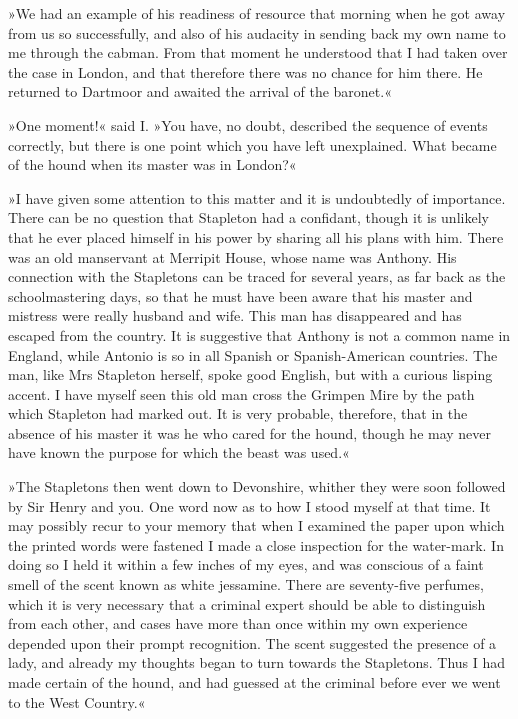 »We had an example of his readiness of resource that morning when he got away from us so successfully, and also of his audacity in sending back my own name to me through the cabman. From that moment he understood that I had taken over the case in London, and that therefore there was no chance for him there. He returned to Dartmoor and awaited the arrival of the baronet.«

»One moment!« said I. »You have, no doubt, described the sequence of events correctly, but there is one point which you have left unexplained. What became of the hound when its master was in London?«

»I have given some attention to this matter and it is undoubtedly of importance. There can be no question that Stapleton had a confidant, though it is unlikely that he ever placed himself in his power by sharing all his plans with him. There was an old manservant at Merripit House, whose name was Anthony. His connection with the Stapletons can be traced for several years, as far back as the schoolmastering days, so that he must have been aware that his master and mistress were really husband and wife. This man has disappeared and has escaped from the country. It is suggestive that Anthony is not a common name in England, while Antonio is so in all Spanish or Spanish-American countries. The man, like Mrs Stapleton herself, spoke good English, but with a curious lisping accent. I have myself seen this old man cross the Grimpen Mire by the path which Stapleton had marked out. It is very probable, therefore, that in the absence of his master it was he who cared for the hound, though he may never have known the purpose for which the beast was used.«

»The Stapletons then went down to Devonshire, whither they were soon followed by Sir Henry and you. One word now as to how I stood myself at that time. It may possibly recur to your memory that when I examined the paper upon which the printed words were fastened I made a close inspection for the water-mark. In doing so I held it within a few inches of my eyes, and was conscious of a faint smell of the scent known as white jessamine. There are seventy-five perfumes, which it is very necessary that a criminal expert should be able to distinguish from each other, and cases have more than once within my own experience depended upon their prompt recognition. The scent suggested the presence of a lady, and already my thoughts began to turn towards the Stapletons. Thus I had made certain of the hound, and had guessed at the criminal before ever we went to the West Country.«

